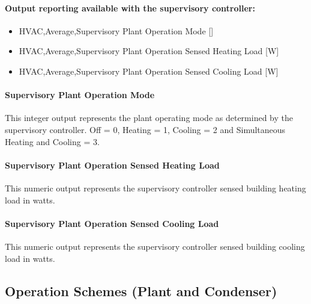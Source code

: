 \paragraph{Output reporting available with the supervisory controller:}\label{operation-scheme-heating-outputs-description}

\begin{itemize}
    \item
    HVAC,Average,Supervisory Plant Operation Mode  {[}{]}
    \item
    HVAC,Average,Supervisory Plant Operation Sensed Heating Load  {[}W{]}
    \item
    HVAC,Average,Supervisory Plant Operation Sensed Cooling Load  {[}W{]}
\end{itemize}

\paragraph{Supervisory Plant Operation Mode}\label{operation-scheme-outputs-supervisory-plant-operation-mode}

This integer output represents the plant operating mode as determined by the supervisory controller. Off = 0, Heating = 1, Cooling = 2 and Simultaneous Heating and Cooling = 3.

\paragraph{Supervisory Plant Operation Sensed Heating Load}\label{operation-scheme-outputs-supervisory-plant-operation-sensed-heating-load}

This numeric output represents the supervisory controller sensed building heating load in watts.

\paragraph{Supervisory Plant Operation Sensed Cooling Load}\label{operation-scheme-outputs-supervisory-plant-operation-sensed-cooling-load}

This numeric output represents the supervisory controller sensed building cooling load in watts.


\subsection{Operation Schemes (Plant and Condenser)}\label{operation-schemes-plant-and-condenser}

